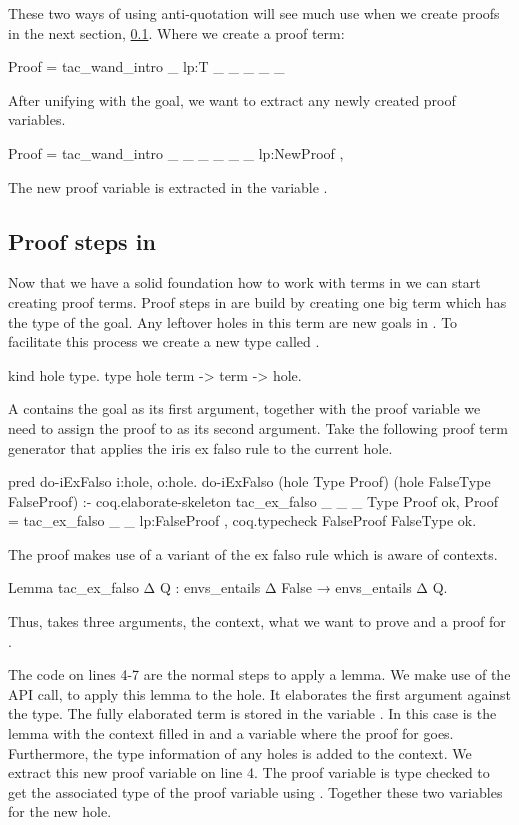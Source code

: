 \documentclass[thesis.tex]{subfiles}
\begin{document}
{{{{These two ways of using anti-quotation will see much use when we create proofs in the next section, \cref{ssec:proofselpi}. Where we create a proof term:
\begin{elpicode}
  Proof = {{ tac_wand_intro _ lp:T _ _ _ _ _ }} 
\end{elpicode}
After unifying  with the goal, we want to extract any newly created proof variables.
\begin{elpicode}[firstnumber=3]
  Proof = {{ tac_wand_intro _ _ _ _ _ _ lp:NewProof }}, 
\end{elpicode}
The new proof variable is extracted in the variable .

\subsection{Proof steps in \elpi}\label{ssec:proofselpi}
Now that we have a solid foundation how to work with \coq terms in \elpi we can start creating proof terms. Proof steps in \elpi are build by creating one big term which has the type of the goal. Any leftover holes in this term are new goals in \coq. To facilitate this process we create a new type called .
\begin{elpicode}
  kind hole type.
  type hole term -> term -> hole. 
\end{elpicode}
A  contains the goal as its first argument, together with the proof variable we need to assign the proof to as its second argument. Take the following proof term generator that applies the iris ex falso rule to the current hole.
\begin{elpicode}
  pred do-iExFalso i:hole, o:hole.
  do-iExFalso (hole Type Proof) 
              (hole FalseType FalseProof) :-
    coq.elaborate-skeleton 
      {{ tac_ex_falso _ _ _ }} Type Proof ok,
    Proof = {{ tac_ex_falso _ _ lp:FalseProof }},
    coq.typecheck FalseProof FalseType ok.
\end{elpicode}
The proof makes use of a variant of the ex falso rule which is aware of contexts.
\begin{coqcode}
  Lemma tac_ex_falso Δ Q : 
    envs_entails Δ False → 
    envs_entails Δ Q.
\end{coqcode}
Thus,  takes three arguments, the context, what we want to prove and a proof for .

The \elpi code on lines 4-7 are the normal steps to apply a lemma. We make use of the \ce API call,  to apply this lemma to the hole. It elaborates the first argument against the type. The fully elaborated term is stored in the variable . In this case  is the lemma with the \iris context filled in and a variable where the proof for  goes. Furthermore, the type information of any holes is added to the \elpi context. We extract this new proof variable on line 4. The proof variable is type checked to get the associated type of the proof variable using . Together these two variables for the new hole.

}}}}
\end{document}
